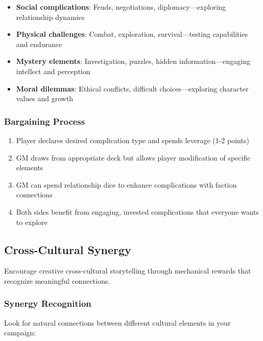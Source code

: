 \begin{itemize}
    \item \textbf{Social complications}: Feuds, negotiations, diplomacy---exploring relationship dynamics
    \item \textbf{Physical challenges}: Combat, exploration, survival---testing capabilities and endurance
    \item \textbf{Mystery elements}: Investigation, puzzles, hidden information---engaging intellect and perception
    \item \textbf{Moral dilemmas}: Ethical conflicts, difficult choices---exploring character values and growth
\end{itemize}

\subsubsection*{Bargaining Process}

\begin{enumerate}
    \item Player declares desired complication type and spends leverage (1-2 points)
    \item GM draws from appropriate deck but allows player modification of specific elements
    \item GM can spend relationship dice to enhance complications with faction connections
    \item Both sides benefit from engaging, invested complications that everyone wants to explore
\end{enumerate}

\subsection*{Cross-Cultural Synergy}

Encourage creative cross-cultural storytelling through mechanical rewards that recognize meaningful connections.

\subsubsection*{Synergy Recognition}

Look for natural connections between different cultural elements in your campaign:

